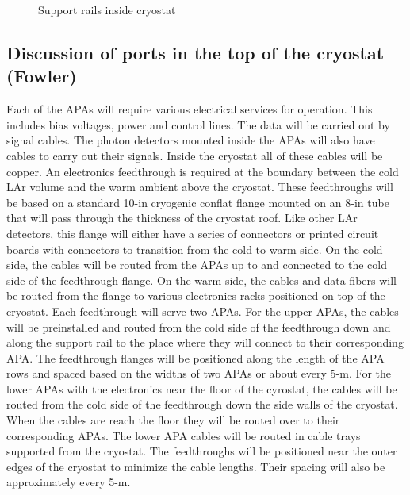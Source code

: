 \begin{figure}[htbp]
\centering
\caption{Support rails inside cryostat} 
\label{fig:support-rails}
\end{figure}

\subsection{Discussion of ports in the top of the cryostat (Fowler)}
\label{fd:install:integ:topports}

Each of the APAs will require various electrical services for operation.  This includes bias voltages, power and control lines.  The data will be carried out by signal cables.  The photon detectors mounted inside the APAs will also have cables to carry out their signals.  Inside the cryostat all of these cables will be copper.  
An electronics feedthrough is required at the boundary between the cold LAr volume and the warm ambient above the cryostat.  These feedthroughs will be based on a standard 10-in cryogenic conflat flange mounted on an 8-in tube that will pass through the thickness of the cryostat roof.  Like other LAr detectors, this flange will either have a series of connectors or printed circuit boards with connectors to transition from the cold to warm side.  On the cold side, the cables will be routed from the APAs up to and connected to the cold side of the feedthrough flange.  On the warm side, the cables and data fibers will be routed from the flange to various electronics racks positioned on top of the cryostat.  
Each feedthrough will serve two APAs.  For the upper APAs, the cables will be preinstalled and routed from the cold side of the feedthrough down and along the support rail to the place where they will connect to their corresponding APA.  The feedthrough flanges will be positioned along the length of the APA rows and spaced based on the widths of two APAs or about every 5-m.   For the lower APAs with the electronics near the floor of the cyrostat, the cables will be routed from the cold side of the feedthrough down the side walls of the cryostat.  When the cables are reach the floor they will be routed over to their corresponding APAs.  The lower APA cables will be routed in cable trays supported from the cryostat.  The feedthroughs will be positioned near the outer edges of the cryostat to minimize the cable lengths.  Their spacing will also be approximately every 5-m.  


